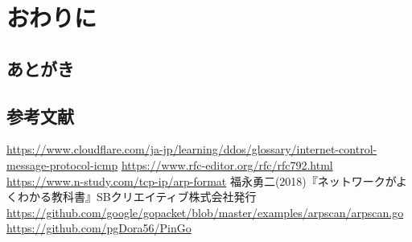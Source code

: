 \subsection{}

\chapter{おわりに}
\section{あとがき}

\section{参考文献}
\begin{thebibliography}{30}
 \url{https://www.cloudflare.com/ja-jp/learning/ddos/glossary/internet-control-message-protocol-icmp}
 \url{https://www.rfc-editor.org/rfc/rfc792.html}
 \url{https://www.n-study.com/tcp-ip/arp-format}
 福永勇二(2018)『ネットワークがよくわかる教科書』SBクリエイティブ株式会社発行
 \url{https://github.com/google/gopacket/blob/master/examples/arpscan/arpscan.go}
 \url{https://github.com/pgDora56/PinGo}
\end{thebibliography}